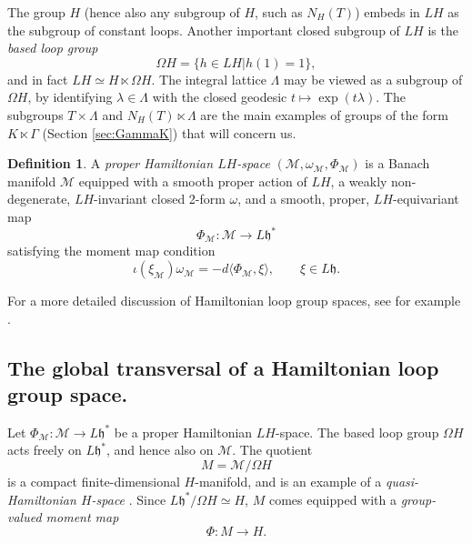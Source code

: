 \documentclass[11pt,reqno]{amsart}
\theoremstyle{definition}
\newtheorem{definition}[theorem]{Definition}
\theoremstyle{remark}
\newcommand{\pair}[2]{\langle #1, #2 \rangle}
\def\h{\ensuremath{\mathfrak{h}}}
\def\M{\ensuremath{\mathcal{M}}}
\begin{document}
The group $H$ (hence also any subgroup of $H$, such as $N_H(T)$) embeds in $LH$ as the subgroup of constant loops.  Another important closed subgroup of $LH$ is the \emph{based loop group}
\[ \Omega H=\{h \in LH|h(1)=1\}, \]
and in fact $LH \simeq H \ltimes \Omega H$.  The integral lattice $\Lambda$ may be viewed as a subgroup of $\Omega H$, by identifying $\lambda \in \Lambda$ with the closed geodesic $t\mapsto \exp(t\lambda)$.  The subgroups $T \times \Lambda$ and $N_H(T) \ltimes \Lambda$ are the main examples of groups of the form $K\ltimes \Gamma$ (Section \ref{sec:GammaK}) that will concern us.

\begin{definition}
A \emph{proper Hamiltonian $LH$-space} $(\M,\omega_{\M},\Phi_\M)$ is a Banach manifold $\M$ equipped with a smooth proper action of $LH$, a weakly non-degenerate, $LH$-invariant closed 2-form $\omega$, and a smooth, proper, $LH$-equivariant map
\[ \Phi_{\M} \colon \M \rightarrow L\h^\ast \]
satisfying the moment map condition
\[ \iota(\xi_{\M})\omega_{\M}=-d\pair{\Phi_\M}{\xi}, \qquad \xi \in L\h.\]
\end{definition}
For a more detailed discussion of Hamiltonian loop group spaces, see for example \cite{MWVerlindeFactorization, AlekseevMalkinMeinrenken,BottTolmanWeitsman}.

\subsection{The global transversal of a Hamiltonian loop group space.}\label{sec:GlobTrans}
Let $\Phi_{\M} \colon \M \rightarrow L\h^\ast$ be a proper Hamiltonian $LH$-space.  The based loop group $\Omega H$ acts freely on $L\h^\ast$, and hence also on $\M$.  The quotient
\[ M=\M/\Omega H \]
is a compact finite-dimensional $H$-manifold, and is an example of a \emph{quasi-Hamiltonian $H$-space} \cite{AlekseevMalkinMeinrenken}.  Since $L\h^\ast/\Omega H \simeq H$, $M$ comes equipped with a \emph{group-valued moment map}
\[ \Phi \colon M \rightarrow H.\]
\end{document}
